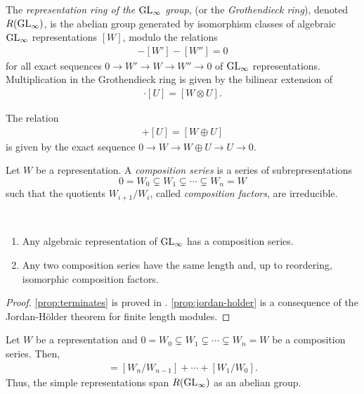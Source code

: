 \documentclass[11pt]{amsart}
\begin{document}
\begin{defin}
    The \emph{representation ring  of the $\mathrm{GL}_\infty$ group}, (or the \emph{Grothendieck ring}), denoted \(R(\mathrm{GL}_\infty)\), is the abelian group generated by isomorphism classes of algebraic $\mathrm{GL}_\infty$ representations $[W]$, modulo the relations
    \begin{align}
        [W] - [W'] - [W''] = 0
    \end{align}
    for all exact sequences \(0 \to W' \to W \to W'' \to 0\) of \(\mathrm{GL}_\infty\) representations. Multiplication in the Grothendieck ring is given by the bilinear extension of 
\begin{align}
    [W] \cdot [U] = [W \otimes U].
\end{align}
\end{defin}

\begin{eg}
    The relation 
    \begin{align*}
        [W] + [U] = [W \oplus U]
    \end{align*}
    is given by the exact sequence \(0 \to W \to W \oplus U  \to U \to 0\).
\end{eg}


\begin{defin}
    Let $W$ be a representation. A \emph{composition series} is a series of subrepresentations
    \[
0 = W_0 \subsetneq W_1 \subsetneq \cdots \subsetneq W_n = W
\]
such that the quotients $W_{i+1}/W_i$, called \emph{composition factors}, are irreducible. 
\end{defin}

\begin{prop}~
    \begin{enumerate}
        \item  Any algebraic representation of \(\mathrm{GL}_\infty\) has a composition series. \label{prop:terminates}
        \item Any two composition series have the same length and, up to reordering, isomorphic composition factors.  \label{prop:jordan-holder}
    \end{enumerate}
\end{prop}

\begin{proof}
    \cref{prop:terminates} is proved in {\cite[Prop. 3.1.5]{SS15}}. \cref{prop:jordan-holder} is a consequence of the Jordan-H\"older theorem for finite length modules. 
\end{proof} 

\begin{prop}\label{prop:comps}
    Let $W$ be a representation and $0 = W_0 \subsetneq W_1 \subsetneq \cdots \subsetneq W_n = W$ be a composition series. Then, 
    \begin{align}
        [W] = [W_n/W_{n - 1}] + \cdots + [W_1/W_0].
    \end{align}
Thus, the simple representations span $R(\mathrm{GL}_\infty)$ as an abelian group.
\end{prop}
\end{document}

